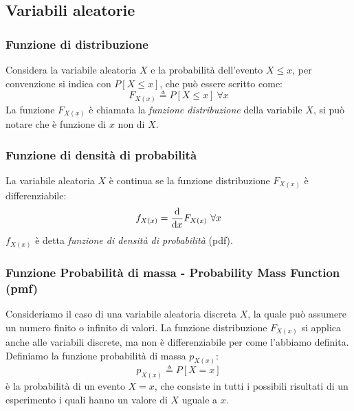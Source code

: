     \subsection{Variabili aleatorie}
        \subsubsection{Funzione di distribuzione}
            Considera la variabile aleatoria $X$ e la probabilità dell'evento $X\leq x$, per convenzione si indica con $P[X\leq x]$,
            che può essere scritto come:
            \[
                F_{X(x)} \triangleq P[X\leq x]\ \forall x    
            \]
            La funzione $F_{X(x)}$ è chiamata la \emph{funzione distribuzione} della variabile $X$, si può notare che è funzione di $x$ non di 
            $X$.
        \subsubsection{Funzione di densità di probabilità}
            La variabile aleatoria $X$ è continua se la funzione distribuzione $F_{X(x)}$ è differenziabile:
            \[
                f_{X(x)} = \derivative{}{x}F_{X(x)}\ \forall x    
            \]
            $f_{X(x)}$ è detta \emph{funzione di densità di probabilità} (pdf).
        \subsubsection{Funzione Probabilità di massa - Probability Mass Function (pmf)}
            Consideriamo il caso di una variabile aleatoria discreta $X$, la quale può assumere un numero finito o infinito di valori. La funzione 
            distribuzione $F_{X(x)}$ si applica anche alle variabili discrete, ma non è differenziabile per come l'abbiamo definita. Definiamo 
            la funzione probabilità di massa $p_{X(x)}$:
            \[
                p_{X(x)} \triangleq P[X = x]    
            \]
            è la probabilità di un evento $X=x$, che consiste in tutti i possibili risultati di un esperimento i quali hanno un valore di 
            $X$ uguale a $x$.
